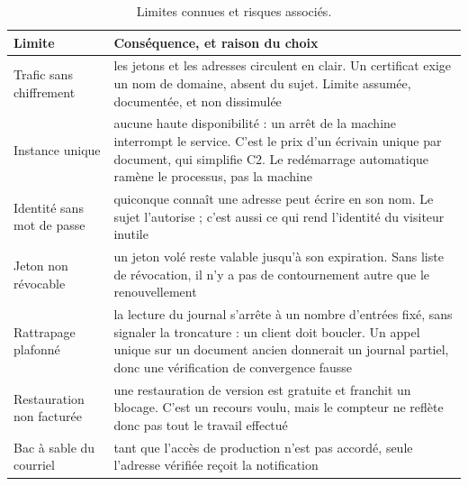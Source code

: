 \begin{table}[H]
\centering
\small
\begin{tabular}{@{}p{4.4cm}p{11.2cm}@{}}
\toprule
\textbf{Limite} & \textbf{Conséquence, et raison du choix} \\
\midrule
Trafic sans chiffrement
& les jetons et les adresses circulent en clair. Un certificat exige un nom de
  domaine, absent du sujet. Limite assumée, documentée, et non dissimulée \\
\addlinespace
Instance unique
& aucune haute disponibilité : un arrêt de la machine interrompt le service.
  C'est le prix d'un écrivain unique par document, qui simplifie C2. Le
  redémarrage automatique ramène le processus, pas la machine \\
\addlinespace
Identité sans mot de passe
& quiconque connaît une adresse peut écrire en son nom. Le sujet l'autorise ;
  c'est aussi ce qui rend l'identité du visiteur inutile \\
\addlinespace
Jeton non révocable
& un jeton volé reste valable jusqu'à son expiration. Sans liste de révocation,
  il n'y a pas de contournement autre que le renouvellement \\
\addlinespace
Rattrapage plafonné
& la lecture du journal s'arrête à un nombre d'entrées fixé, sans signaler la
  troncature : un client doit boucler. Un appel unique sur un document ancien
  donnerait un journal partiel, donc une vérification de convergence fausse \\
\addlinespace
Restauration non facturée
& une restauration de version est gratuite et franchit un blocage. C'est un
  recours voulu, mais le compteur ne reflète donc pas tout le travail effectué \\
\addlinespace
Bac à sable du courriel
& tant que l'accès de production n'est pas accordé, seule l'adresse vérifiée
  reçoit la notification \\
\bottomrule
\end{tabular}
\caption{Limites connues et risques associés.}
\label{tab:limites}
\end{table}

